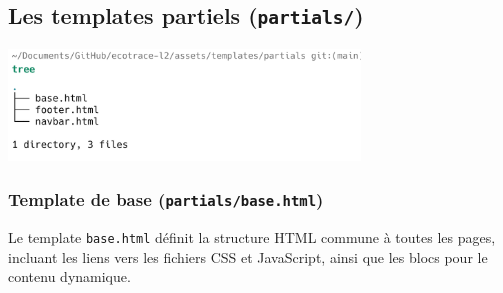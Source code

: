 \documentclass[a4paper,11pt]{article}
\begin{document}
            \subsection{Les templates partiels (\texttt{partials/})}
                \begin{center}
                    \includegraphics[width=0.7\textwidth]{captures/templates_et_static/templates/partials/img1.png}
                \end{center}

                \subsubsection{Template de base (\texttt{partials/base.html})}
                    \noindent Le template \texttt{base.html} définit la structure HTML commune à toutes les pages, incluant les liens vers les fichiers CSS et JavaScript, ainsi que les blocs pour le contenu dynamique.
\end{document}
